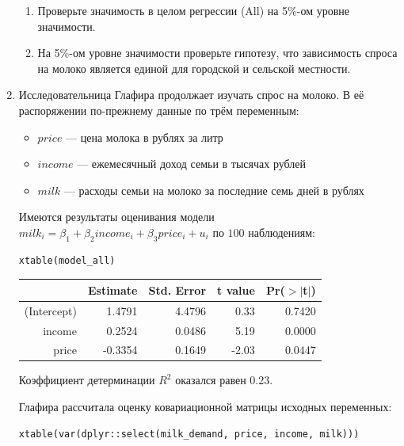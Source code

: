 \documentclass[12pt, a4paper]{article}
\begin{document}
\begin{enumerate}
\begin{enumerate}
\item Проверьте значимость в целом регрессии (All) на 5\%-ом уровне значимости.
\item На 5\%-ом уровне значимости проверьте гипотезу, что зависимость спроса на молоко является единой для городской и сельской местности.
\end{enumerate}

\item Исследовательница Глафира продолжает изучать спрос на молоко. В её распоряжении по-прежнему данные по трём переменным:
\begin{itemize}
\item $price$ — цена молока в рублях за литр
\item $income$ — ежемесячный доход семьи в тысячах рублей
\item $milk$ — расходы семьи на молоко за последние семь дней в рублях
\end{itemize}

Имеются результаты оценивания модели $milk_i = \beta_1 + \beta_2 income_i + \beta_3 price_i + u_i$ по $100$ наблюдениям:
\begin{verbatim}
xtable(model_all)
\end{verbatim}


\begin{tabular}{rrrrr}
  \hline
 & Estimate & Std. Error & t value & Pr($>$$|$t$|$) \\
  \hline
(Intercept) & 1.4791 & 4.4796 & 0.33 & 0.7420 \\
  income & 0.2524 & 0.0486 & 5.19 & 0.0000 \\
  price & -0.3354 & 0.1649 & -2.03 & 0.0447 \\
   \hline
\end{tabular}



Коэффициент детерминации $R^2$ оказался равен $0.23$.


Глафира рассчитала оценку ковариационной матрицы исходных переменных:

\begin{verbatim}
xtable(var(dplyr::select(milk_demand, price, income, milk)))
\end{verbatim}



\end{enumerate}
\end{document}
